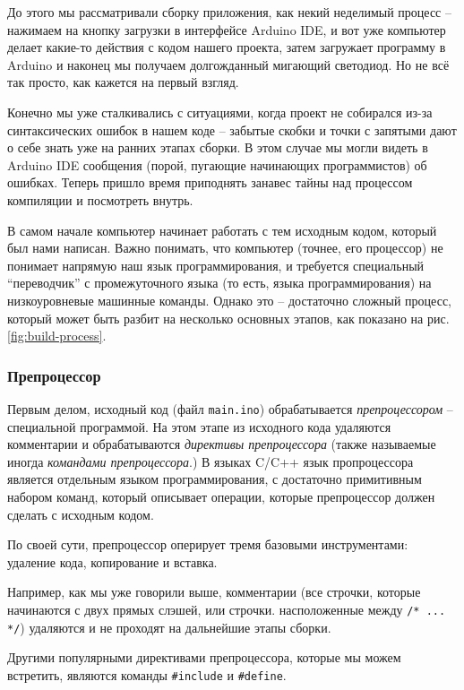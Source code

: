 \documentclass[../sparc.tex]{subfiles}
\begin{document}
До этого мы рассматривали сборку приложения, как некий неделимый процесс --
нажимаем на кнопку загрузки в интерфейсе Arduino IDE, и вот уже компьютер делает
какие-то действия с кодом нашего проекта, затем загружает программу в Arduino и
наконец мы получаем долгожданный мигающий светодиод.  Но не всё так просто, как
кажется на первый взгляд.

Конечно мы уже сталкивались с ситуациями, когда проект не собирался из-за
синтаксических ошибок в нашем коде -- забытые скобки и точки с запятыми дают о
себе знать уже на ранних этапах сборки.  В этом случае мы могли видеть в Arduino
IDE сообщения (порой, пугающие начинающих программистов) об ошибках.  Теперь
пришло время приподнять занавес тайны над процессом компиляции и посмотреть
внутрь.

В самом начале компьютер начинает работать с тем исходным кодом, который был
нами написан.  Важно понимать, что компьютер (точнее, его процессор) не понимает
напрямую наш язык программирования, и требуется специальный ``переводчик'' с
промежуточного языка (то есть, языка программирования) на низкоуровневые
машинные команды.  Однако это -- достаточно сложный процесс, который может быть
разбит на несколько основных этапов, как показано на
рис. \ref{fig:build-process}.


\subsubsection{Препроцессор}

Первым делом, исходный код (файл \texttt{main.ino}) обрабатывается
\emph{препроцессором} -- специальной программой.  На этом этапе из исходного кода
удаляются комментарии и обрабатываются \emph{директивы препроцессора} (также
называемые иногда \emph{командами препроцессора}.)  В языках C/C++ язык
пропроцессора является отдельным языком программирования, с достаточно
примитивным набором команд, который описывает операции, которые препроцессор
должен сделать с исходным кодом.

По своей сути, препроцессор оперирует тремя базовыми инструментами: удаление
кода, копирование и вставка.

Например, как мы уже говорили выше, комментарии (все строчки, которые начинаются
с двух прямых слэшей, или строчки. насположенные между \texttt{/*
  ... */}) удаляются и не проходят на дальнейшие этапы сборки.

Другими популярными директивами препроцессора, которые мы можем встретить,
являются команды \texttt{#include} и \texttt{#define}.
\end{document}
